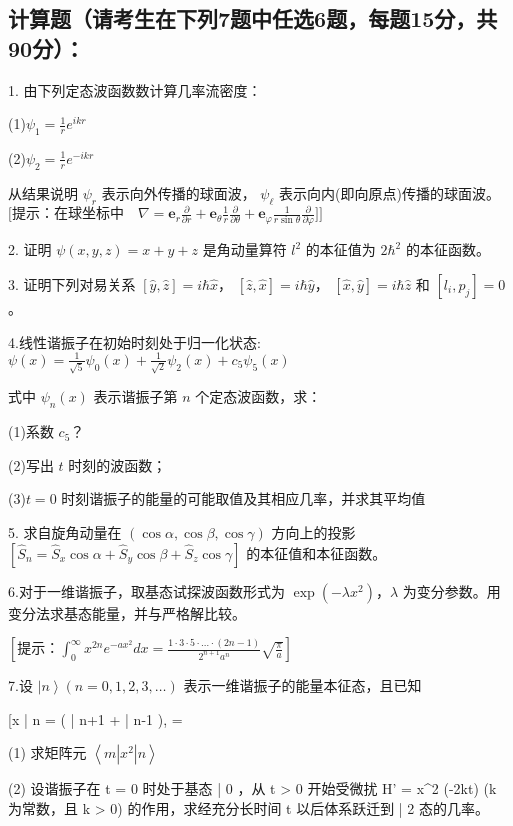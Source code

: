 \subsection{计算题（请考生在下列7题中任选6题，每题15分，共90分）：}

1. 由下列定态波函数数计算几率流密度：

(1)$\psi_1 = \frac{1}{r} e^{ikr}$ 


(2)$\psi_2 = \frac{1}{r} e^{-ikr}$

从结果说明 $\psi_r$ 表示向外传播的球面波， $\psi_\ell$ 表示向内(即向原点)传播的球面波。
$\text{[提示：在球坐标中}\quad \nabla = \mathbf{e}_r \frac{\partial}{\partial r} + \mathbf{e}_\theta \frac{1}{r} \frac{\partial}{\partial \theta} + \mathbf{e}_\varphi \frac{1}{r \sin \theta} \frac{\partial}{\partial \varphi}\text{]}]$

2. 证明 $\psi (x,y,z) = x + y + z$ 是角动量算符 $l^2$ 的本征值为 $2\hbar^2$ 的本征函数。

3. 证明下列对易关系 $[ \hat{y}, \hat{z} ] = i\hbar \hat{x}$， $[\hat{z}, \hat{x}] = i\hbar \hat{y}$， $[\hat{x}, \hat{y}] = i\hbar \hat{z}$ 和 $[l_i, p_j] = 0$。

4.线性谐振子在初始时刻处于归一化状态:
$\psi(x) = \frac{1}{\sqrt{5}} \psi_0(x) + \frac{1}{\sqrt{2}} \psi_2(x) + c_5 \psi_5(x)$

式中 $\psi_n(x)$ 表示谐振子第 $n$ 个定态波函数，求：

(1)系数 $c_5$？

(2)写出 $t$ 时刻的波函数；

(3)$t=0$ 时刻谐振子的能量的可能取值及其相应几率，并求其平均值

5. 求自旋角动量在 $(\cos \alpha, \cos \beta, \cos \gamma)$ 方向上的投影
$[\hat{S}_n = \hat{S}_x \cos \alpha + \hat{S}_y \cos \beta + \hat{S}_z \cos \gamma]$
的本征值和本征函数。

6.对于一维谐振子，取基态试探波函数形式为 $\exp(-\lambda x^2)$，$\lambda$ 为变分参数。用变分法求基态能量，并与严格解比较。

$\left[ \text{提示：} \int_{0}^{\infty} x^{2n} e^{-ax^2} dx = \frac{1 \cdot 3 \cdot 5 \cdot \ldots \cdot (2n-1)}{2^{n+1} a^n} \sqrt{\frac{\pi}{a}} \right]$

7.设 $\left| n \right\rangle (n = 0, 1, 2, 3, \ldots)$ 表示一维谐振子的能量本征态，且已知

[x \left| n \right\rangle =  \left(  \left| n+1 \right\rangle +  \left| n-1 \right\rangle \right), \quad \alpha = \sqrt{\frac{\mu \omega}{\hbar}}\]


(1) 求矩阵元 $\left\langle m \left| x^2 \right| n \right\rangle$

(2) 设谐振子在 t = 0 时处于基态 \left| 0 \right\rangle，从 t > 0 开始受微扰 H' = x^2 \exp(-2kt) (k 为常数，且 k > 0) 的作用，求经充分长时间 t \to \infty 以后体系跃迁到 \left| 2 \right\rangle 态的几率。
